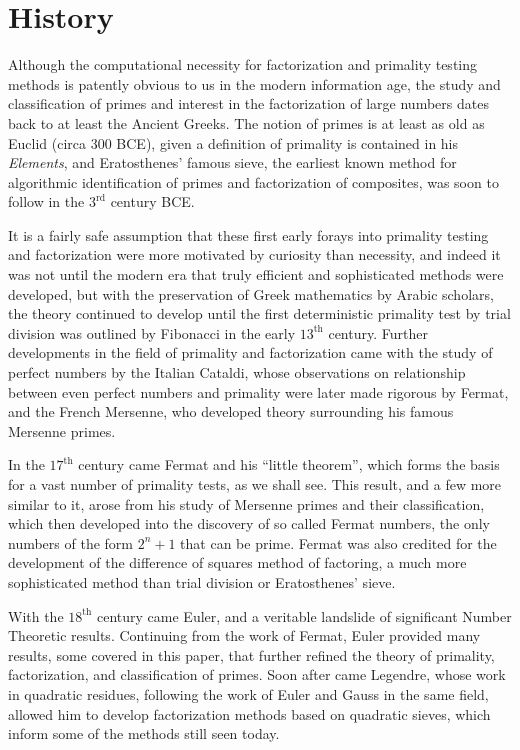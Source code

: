 \documentclass{article}
\begin{document}
\section*{History}\label{History}
  
\par Although the computational necessity for factorization and primality testing methods is patently obvious to us in the modern 
information age, the study and classification of primes and interest in the factorization of large numbers dates back to at least the Ancient Greeks. The notion of primes is at least as old as Euclid (circa 300 BCE), given a definition of primality is contained in his \textit{ Elements}, %
and Eratosthenes' famous sieve, the earliest known method for algorithmic identification of primes and factorization of composites, was soon to follow in the $3^{\text{rd}}$ century BCE. 
\par It is a fairly safe assumption that these first early forays into primality testing and factorization were more motivated by curiosity than necessity, and indeed it was not until the modern era that truly efficient and sophisticated methods were developed, but with the preservation of Greek mathematics by Arabic scholars, the theory continued to develop until the first deterministic primality test by trial division was outlined by Fibonacci in the early $13^{\text{th}}$ century. Further developments in the field of primality and factorization came with the study of perfect numbers by the Italian Cataldi, whose observations on relationship between even perfect numbers and primality were later made rigorous by Fermat, and the French Mersenne, who developed theory surrounding his famous Mersenne primes.
\par In the $17^{\text{th}}$ century came Fermat and his ``little theorem'', which forms the basis for a vast number of primality tests, as we shall see. This result, and a few more similar to it, arose from his study of Mersenne primes and their classification, which then developed into the discovery of so called Fermat numbers, the only numbers of the form $2^n + 1$ that can be prime. Fermat was also credited for the development of the difference of squares method of factoring, a much more sophisticated method than trial division or Eratosthenes' sieve.
\par With the $18^{\text{th}}$ century came Euler, and a veritable landslide of significant Number Theoretic results. Continuing from the work of Fermat, Euler provided many results, some covered in this paper, that further refined the theory of primality, factorization, and classification of primes. Soon after came Legendre, whose work in quadratic residues, following the work of Euler and Gauss in the same field, allowed him to develop factorization methods based on quadratic sieves, which inform some of the methods still seen today.
\end{document}
